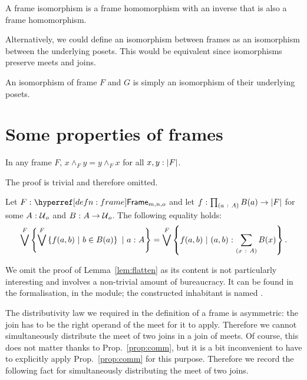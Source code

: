 \begin{defn}
  A frame isomorphism is a frame homomorphism with an inverse that is also a frame
  homomorphism.
\end{defn}

Alternatively, we could define an isomorphism between frames as an isomorphism between the
underlying posets. This would be equivalent since isomorphisms preserve meets and joins.
\begin{defn}
  An isomorphism of frame $F$ and $G$ is simply an isomorphism of their underlying posets.
\end{defn}

\section{Some properties of frames}

\begin{prop}\label{prop:comm}
  In any frame $F$, $x \wedge_F y = y \wedge_F x$ for all $x, y:\left| F \right|$.
\end{prop}
The proof is trivial and therefore omitted.

\begin{lemma}\label{lem:flatten}
  Let $\oftyI{F}{\framety{m}{n}{o}}$ and let $f\hspace{0.1mm}:\hspace{0.1mm}\prod_{(a~:~A)} B(a) \rightarrow \left| F \right|$ for
  some $A\hspace{0.1mm}:\hspace{0.1mm}\mathcal{U}{}_o$ and $B\hspace{0.1mm}:\hspace{0.1mm}A \rightarrow \mathcal{U}{}_o$. The following equality
  holds:
  \begin{equation*}
      \bigvee^F \left\{  \bigvee^F \left\{  f(a, b) ~|~ b \in B(a)  \right\} ~|~ a\hspace{0.1mm}:\hspace{0.1mm}A           \right\}
    = \bigvee^F \left\{  f(a, b)             ~|~ (a, b)\hspace{0.1mm}:\hspace{0.1mm}\sum_{(x~:~A)} B(x)  \right\}.
  \end{equation*}
\end{lemma}

We omit the proof of Lemma~\ref{lem:flatten} as its content is not particularly
interesting and involves a non-trivial amount of bureaucracy. It can be found in the
\veragda{} formalisation, in the  module; the constructed inhabitant is
named .

The distributivity law we required in the definition of a frame is asymmetric: the join
has to be the right operand of the meet for it to apply. Therefore we cannot
simultaneously distribute the meet of two joins in a join of meets. Of course, this does
not matter thanks to Prop.~\ref{prop:comm}, but it is a bit inconvenient to have to
explicitly apply Prop.~\ref{prop:comm} for this purpose. Therefore we record the following
fact for simultaneously distributing the meet of two joins.

